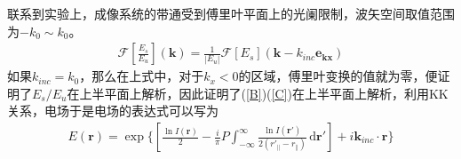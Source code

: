 \documentclass[12pt,aspectratio=169]{beamer} %
\renewcommand{\vec}[1]{\boldsymbol{#1}} %
\begin{document}
\begin{frame}
    联系到实验上，成像系统的带通受到傅里叶平面上的光阑限制，波矢空间取值范围为$-k_0\sim k_0$。
    \begin{align}
        \mathcal{F} [\frac{E_s}{E_u}](\vec{k})=\frac{1}{|E_u|} \mathcal{F} [E_s](\vec{k}-k_{inc}\vec{e_{kx}})
    \end{align} 
    如果$k_{inc}=k_0$，那么在上式中，对于$k_x<0$的区域，傅里叶变换的值就为零，便证明了$E_s/E_u$在上半平面上解析，因此证明了(\ref{B})(\ref{C})在上半平面上解析，利用KK关系，电场于是电场的表达式可以写为
    \begin{align}
        E(\vec{r})=\exp\{[\frac{\ln I(\vec{r})}{2}-\frac{i}{\pi}P\int_{-\infty}^{\infty}\frac{\ln I(\vec{r'})}{2(r'_{\parallel} -r_{\parallel})}\, \mathrm{d}\vec{r'}]+i\vec{k}_{inc} \cdot \vec{r}\}
    \end{align}
\end{frame}
\end{document}
